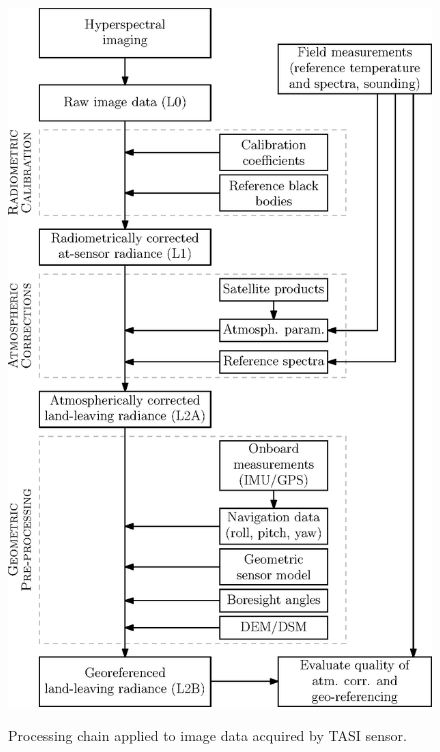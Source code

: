 \begin{figure}[thb]
	\centering
	\vspace{0.7 em}
	\includegraphics[scale=1]{pics/Chapter_02/Fig_2_3.eps}
	\label{fig:ProcessingChain}
	\vspace{2 em}
	\caption{Processing chain applied to image data acquired by TASI sensor.}
	\label{fig:ProcessingChain}
	\vspace{0.7 em}
\end{figure}


